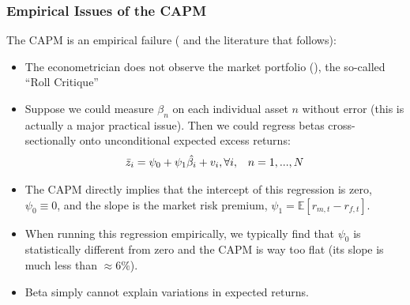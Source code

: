 \documentclass[xcolor=dvipsnames, english, 8pt]{beamer}
\begin{document}
\begin{frame}
    \frametitle{Empirical Issues of the CAPM}

The CAPM is an empirical failure (\cite{Black1972} and the literature that follows):\vspace{0.25cm}\\
        \begin{itemize}
        \item The econometrician does not observe the market portfolio (\cite{Roll1977}), the so-called ``Roll Critique''
        \item Suppose we could measure $\beta_n$ on each individual asset $n$ without error (this is actually a major practical issue). Then we could regress betas cross-sectionally onto unconditional expected excess returns:\begin{align}
        \begin{array}{c c}\bar{z}_i = \psi_0 + \psi_1\hat{\beta_i}+ v_i, \forall i, & n=1,...,N\end{array}
        \end{align}
        \item The CAPM directly implies that the intercept of this regression is zero, $\psi_0\equiv 0$, and the slope is the market risk premium, $\psi_1=\mathbb{E}[r_{m,t} -  r_{f,t}]$.
        \item When running this regression empirically, we typically find that $\psi_0$ is statistically different from zero and the CAPM is way too flat (its slope is much less than $\approx 6\%$).
        \item Beta simply cannot explain variations in expected returns.
    \end{itemize}
\end{frame}
\end{document}
